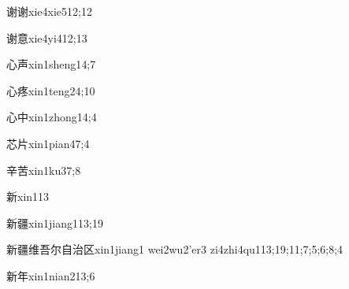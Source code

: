 \begin{verbete}{谢谢}{xie4xie5}{12;12}
\end{verbete}

\begin{verbete}{谢意}{xie4yi4}{12;13}
\end{verbete}

\begin{verbete}{心声}{xin1sheng1}{4;7}
\end{verbete}

\begin{verbete}{心疼}{xin1teng2}{4;10}
\end{verbete}

\begin{verbete}{心中}{xin1zhong1}{4;4}
\end{verbete}

\begin{verbete}{芯片}{xin1pian4}{7;4}
\end{verbete}

\begin{verbete}{辛苦}{xin1ku3}{7;8}
\end{verbete}

\begin{verbete}{新}{xin1}{13}
\end{verbete}

\begin{verbete}{新疆}{xin1jiang1}{13;19}
\end{verbete}

\begin{verbete}{新疆维吾尔自治区}{xin1jiang1 wei2wu2'er3 zi4zhi4qu1}{13;19;11;7;5;6;8;4}
\end{verbete}

\begin{verbete}{新年}{xin1nian2}{13;6}
\end{verbete}

